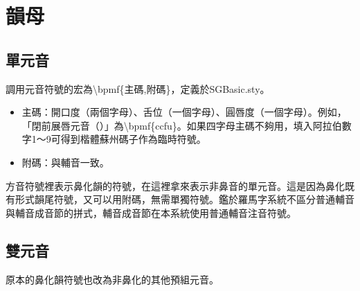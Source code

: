 \section{韻母}
\subsection{單元音}
調用元音符號的宏為{\textbackslash}bpmf\{主碼,附碼\}，定義於SGBasic.sty。\par
\begin{itemize}
	\item 主碼：開口度（兩個字母）、舌位（一個字母）、圓唇度（一個字母）。例如，「閉前展唇元音（）」為{\textbackslash}bpmf\{ccfu\}。如果四字母主碼不夠用，填入阿拉伯數字1～9可得到楷體蘇州碼子作為臨時符號。
	\item 附碼：與輔音一致。
\end{itemize}
方音符號裡表示鼻化韻的符號，在這裡拿來表示非鼻音的單元音。這是因為鼻化既有形式韻尾符號，又可以用附碼，無需單獨符號。鑑於羅馬字系統不區分普通輔音與輔音成音節的拼式，輔音成音節在本系統使用普通輔音注音符號。\par


\subsection{雙元音}
原本的鼻化韻符號也改為非鼻化的其他預組元音。\par
{}%

\clearpage